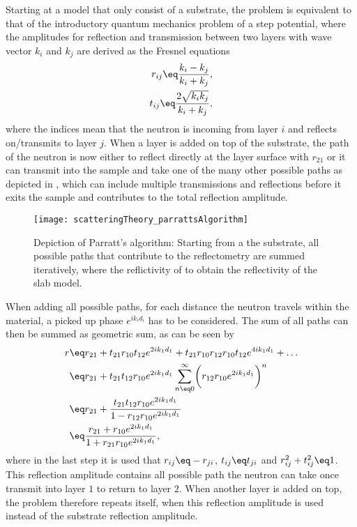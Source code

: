 \documentclass[\main/dresen_thesis.tex]{subfiles}
\begin{document}
    Starting at a model that only consist of a substrate, the problem is equivalent to that of the introductory quantum mechanics problem of a step potential, where the amplitudes for reflection and transmission between two layers with wave vector $k_i$ and $k_j$ are derived as the Fresnel equations
    \begin{align}
      r_{ij} \eq \frac{k_i - k_j}{k_i+k_j},\\
      t_{ij} \eq \frac{2 \sqrt{k_i k_j}}{k_i+k_j},
    \end{align}
    where the indices mean that the neutron is incoming from layer $i$ and reflects on/transmits to layer $j$.
    When a layer is added on top of the substrate, the path of the neutron is now either to reflect directly at the layer surface with $r_{21}$ or it can transmit into the sample and take one of the many other possible paths as depicted in , which can include multiple transmissions and reflections before it exits the sample and contributes to the total reflection amplitude.
    \begin{figure}
      \centering
      \texttt{[image: scatteringTheory\_parrattsAlgorithm]}
      \caption{\label{fig:theoreticalBackground:scattering:reflectometry:parratt}Depiction of Parratt's algorithm: Starting from a the substrate, all possible paths that contribute to the reflectometry are summed iteratively, where the reflictivity of  to obtain the reflectivity of the slab model.}
    \end{figure}
    When adding all possible paths, for each distance the neutron travels within the material, a picked up phase $e^{i k_i d_i}$ has to be considered.
    The sum of all paths can then be summed as geometric sum, as can be seen by
    \begin{align}
      \begin{split}
        r &\eq r_{21} + t_{21} r_{10} t_{12} e^{2 i k_1 d_1} + t_{21} r_{10} r_{12} r_{10} t_{12} e^{4 i k_1 d_1} + \ldots\\
        &\eq r_{21} + t_{21} t_{12} r_{10} e^{2 i k_1 d_1} \sum_{n\eq0}^\infty \biggl(r_{12} r_{10} e^{2 i k_1 d_1}\biggr)^n\\
        &\eq r_{21} + \frac{t_{21} t_{12} r_{10} e^{2 i k_1 d_1}} {1 - r_{12} r_{10} e^{2 i k_1 d_1}}\\
        &\eq \frac{r_{21} + r_{10} e^{2 i k_1 d_1}} {1 + r_{21} r_{10} e^{2 i k_1 d_1}},
      \end{split}
    \end{align}
    where in the last step it is used that $r_{ij} \eq -r_{ji}$, $t_{ij} \eq t_{ji}$ and $r_{ij}^2 + t_{ij}^2 \eq 1$.
    This reflection amplitude contains all possible path the neutron can take once transmit into layer $1$ to return to layer $2$.
    When another layer is added on top, the problem therefore repeats itself, when this reflection amplitude is used instead of the substrate reflection amplitude.
\end{document}
